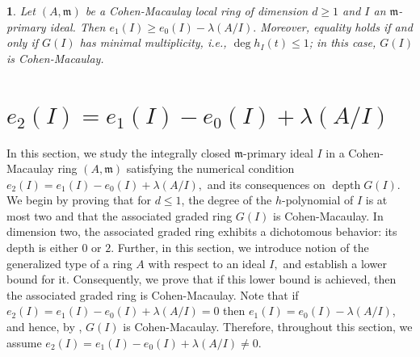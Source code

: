 \documentclass[11pt]{amsart}
\theoremstyle{plain}
\newtheorem{point}[theorem]{}
\newcommand{\m}{\mathfrak{m}}
\newcommand{\depth}{\operatorname{depth}}
\theoremstyle{plain}
\begin{document}
\begin{point}\cite[Definition 15 and Theorem 16]{HCCMM} 
\normalfont
Let $(A,\m)$ be a Cohen-Macaulay local ring of dimension $d\geq 1$ and $I$ an $\m$-primary ideal. Then $e_1(I)\geq e_0(I)-\lambda(A/I).$ Moreover, equality holds if and only if  $G(I)$  has \textit{minimal multiplicity}, i.e., $\deg h_{I}(t) \leq 1$; in this case, $G(I)$  is Cohen-Macaulay. 
\end{point}







 
\section[]{ $e_{2}(I)= e_{1}(I)-e_{0}(I)+\lambda(A/I)$}
   In this section, we study the integrally closed $\m$-primary ideal $I$ in a Cohen-Macaulay ring $(A, \m)$ satisfying  the numerical condition $e_{2}(I)= e_{1}(I)-e_{0}(I)+\lambda(A/I),$ and its consequences  on $\depth G(I).$
We begin by proving that for $d \leq 1$, %
the degree of the 
$h$-polynomial of $I$ is at most two and that the associated graded ring  $G(I)$ is Cohen-Macaulay. In dimension two, the associated graded ring exhibits a dichotomous behavior: its depth is either $0$ or $2$. Further, in this section, we introduce notion of  the generalized type of a ring $A$ with respect to an ideal $I,$ and establish a lower bound for it. Consequently, we prove that if this lower bound is achieved, then the associated graded ring is Cohen-Macaulay.
Note that if  $e_2(I)=e_{1}(I)-e_{0}(I)+\lambda(A/I)=0$ then $e_{1}(I)=e_{0}(I)-\lambda(A/I)$, and hence,  by \cite[Theorem 16]{HCCMM}, $G(I)$ is Cohen-Macaulay. Therefore, throughout this section, we assume  $e_{2}(I)= e_{1}(I)-e_{0}(I)+\lambda(A/I) \neq 0.$
\end{document}
